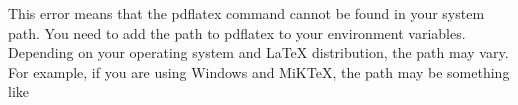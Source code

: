 \documentclass{article}
\begin{document}
This error means that the pdflatex command cannot be found in your system path. You need to add the path to pdflatex to your environment variables. Depending on your operating system and LaTeX distribution, the path may vary. For example, if you are using Windows and MiKTeX, the path may be something like
\end{document}
